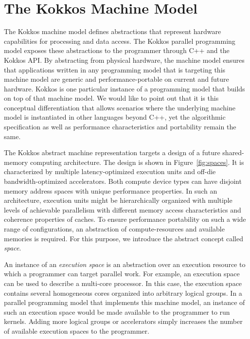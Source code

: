 \section{The Kokkos Machine Model}\label{chap:kokkosMM}

The Kokkos machine model defines abstractions that represent hardware capabilities for processing and data access. The Kokkos parallel programming model exposes these abstractions to the programmer through C++ and the Kokkos API. By abstracting from physical hardware, the machine model ensures that applications written in any programming model that is targeting this machine model are generic and performance-portable on current and future hardware. Kokkos is one particular instance of a programming model that builds on top of that machine model. We would like to point out that it is this conceptual differentiation that allows scenarios where the underlying machine model is instantiated in other languages beyond C++, yet the algorithmic specification as well as performance characteristics and portability remain the same. 

The Kokkos abstract machine representation targets a design of a future shared-memory computing architecture. The design is shown in Figure~\ref{fig:spaces}. It is characterized by multiple latency-optimized execution units and off-die bandwidth-optimized accelerators. Both compute device types can have disjoint memory address spaces with unique performance properties. In such an architecture, execution units might be hierarchically organized with multiple levels of achievable parallelism with different memory access characteristics and coherence properties of caches. To ensure performance portability on such a wide range of configurations, an abstraction of compute-resources and available memories is required. For this purpose, we introduce the abstract concept called \emph{space}.

An instance of an \emph{execution space} is an abstraction over an execution resource to which a programmer can target parallel work. For example, an execution space can be used to describe a multi-core processor. In this case, the execution space contains several homogeneous cores organized into arbitrary logical groups. In a parallel programming model that implements this machine model, an instance of such an execution space would be made available to the programmer to run kernels. Adding more logical groups or accelerators simply increases the number of available execution spaces to the programmer.

